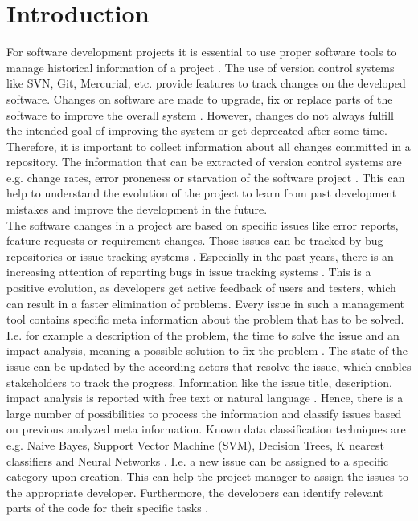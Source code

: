 \section{Introduction}
\label{sec:introduction}

For software development projects it is essential to use proper software tools to manage historical information of a project \cite{fischer2003populating}. The use of version control systems like SVN, Git, Mercurial, etc. provide features to track changes on the developed software. Changes on software are made to upgrade, fix or replace parts of the software to improve the overall system \cite{janak2009issue}. However, changes do not always fulfill the intended goal of improving the system or get deprecated after some time. Therefore, it is important to collect information about all changes committed in a repository. The information that can be extracted of version control systems are e.g. change rates, error proneness or starvation of the software project \cite{fischer2003populating}. This can help to understand the evolution of the project to learn from past development mistakes and improve the development in the future.\\

The software changes in a project are based on specific issues like error reports, feature requests or requirement changes. Those issues can be tracked by bug repositories or issue tracking systems \cite{fischer2003populating}. Especially in the past years, there is an increasing attention of reporting bugs in issue tracking systems \cite{ahmedpredicting}. This is a positive evolution, as developers get active feedback of users and testers, which can result in a faster elimination of problems. 
Every issue in such a management tool contains specific meta information about the problem that has to be solved. I.e. for example a description of the problem, the time to solve the issue and an impact analysis, meaning a possible solution to fix the problem \cite{fischer2003populating}. The state of the issue can be updated by the according actors that resolve the issue, which enables stakeholders to track the progress. Information like the issue title, description, impact analysis is reported with free text or natural language \cite{ahmedpredicting}. Hence, there is a large number of possibilities to process the information and classify issues based on previous analyzed meta information. Known data classification techniques are e.g. Naive Bayes, Support Vector Machine (SVM), Decision Trees, K nearest classifiers and Neural Networks \cite{ahmedpredicting}\cite{lancaster2003indexing}. I.e. a new issue can be assigned to a specific category upon creation. This can help the project manager to assign the issues to the appropriate developer. Furthermore, the developers can identify relevant parts of the code for their specific tasks \cite{ying2004predicting}.\\

